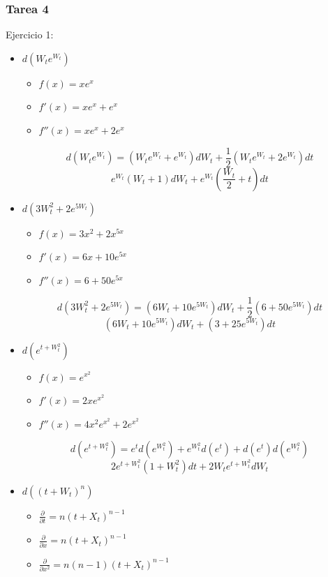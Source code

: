 \documentclass[11pt,fleqn]{book} %
\numberwithin{equation}{section} %
\numberwithin{figure}{section} %
\numberwithin{table}{section} %
\begin{document}
\subsubsection{Tarea 4}
Ejercicio 1: 
\begin{itemize}
    \item $d(W_{t}e^{W_{t}})$
    \begin{itemize}
        \item $f(x) = xe^{x}$
        \item $f'(x) = xe^{x} + e^{x} $
        \item $f''(x) = xe^{x} + 2e^{x} $
    \end{itemize}
    $$ d(W_{t}e^{W_{t}}) = (W_{t}e^{W_{t}} + e^{W_{t}})dW_{t} + \frac{1}{2}(W_{t}e^{W_{t}} + 2e^{W_{t}})dt      $$
    $$ e^{W_{t}}(W_{t} +1) dW_{t} + e^{W_{t}}(\frac{W_{t}}{2} + t) dt $$
    \item $d(3W_{t}^{2} + 2e^{5W_{t}})$
    \begin{itemize}
        \item $f(x) = 3x^{2} + 2x^{5x} $
        \item $f'(x) = 6x+ 10e^{5x}$
        \item $f''(x) = 6 + 50e^{5x}$
    \end{itemize}
    $$ d(3W_{t}^{2} + 2e^{5W_{t}}) = (6W_{t} + 10e^{5W_{t}})dW_{t} + \frac{1}{2} (6+50e^{5W_{t}})dt      $$
    $$ (6W_{t} + 10 e^{5W_{t}})dW_{t} + (3+25e^{5W_{t}})dt      $$
    \item $d(e^{t+W_{t}^{2}})$
    \begin{itemize}
        \item $f(x) = e^{x^{2}} $
        \item $f'(x) = 2xe^{x^{2}}$
        \item $f''(x) = 4x^{2}e^{x^{2}} + 2e^{x^{2}} $
    \end{itemize}
    $$ d(e^{t+W_{t}^{2}}) = e^{t} d(e^{W_{t}^{2}}) +  e^{W_{t}^{2}} d(e^{t}) + d(e^{t})d(e^{W_{t}^{2}})     $$
    $$  2e^{t + W_{t}^{2}}(1+W_{t}^{2})dt + 2W_{t}e^{t+W_{t}^{2}}dW_{t} $$
    \item $d((t+W_{t})^{n})$
    \begin{itemize}
        \item $\frac{\partial}{\partial t} = n(t + X_{t})^{n-1}$
        \item $\frac{\partial}{\partial x} = n(t + X_{t})^{n-1}$
        \item $\frac{\partial}{\partial x^{2}}= n(n-1)(t + X_{t})^{n-1} $
    \end{itemize}

\end{itemize}
\end{document}
